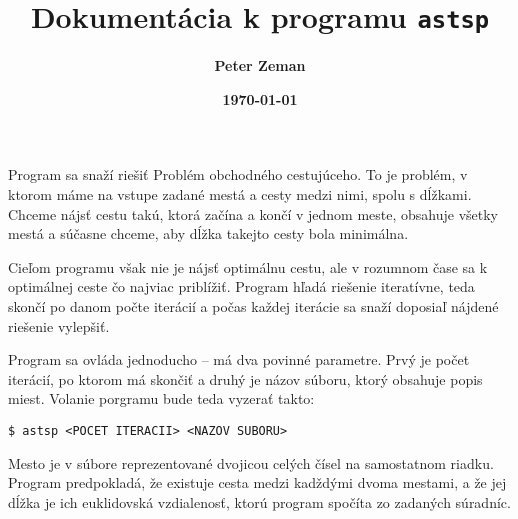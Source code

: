 \documentclass[12pt,a4paper]{article}
\title{\bf Dokumentácia k programu \texttt{astsp}}
\date{\bf\today}
\author{\bf Peter Zeman}
\begin{document}
\maketitle

Program sa snaží riešiť Problém obchodného cestujúceho. To je problém, v ktorom máme na vstupe zadané mestá a cesty
medzi nimi, spolu s dĺžkami. Chceme nájsť cestu takú, ktorá začína a končí v jednom meste, obsahuje všetky mestá a
súčasne chceme, aby dĺžka takejto cesty bola minimálna.

Cieľom programu však nie je nájsť optimálnu cestu, ale v rozumnom čase sa k optimálnej ceste čo najviac priblížiť.
Program hľadá riešenie iteratívne, teda skončí po danom počte iterácií a počas každej iterácie sa snaží doposiaľ nájdené
riešenie vylepšiť.

Program sa ovláda jednoducho -- má dva povinné parametre. Prvý je počet iterácií, po ktorom má skončiť a druhý je názov
súboru, ktorý obsahuje popis miest. Volanie porgramu bude teda vyzerať takto:
\begin{verbatim}$ astsp <POCET ITERACII> <NAZOV SUBORU>\end{verbatim}
Mesto je v súbore reprezentované dvojicou celých čísel na samostatnom riadku. Program predpokladá, že existuje cesta
medzi kadždými dvoma mestami, a že jej dĺžka je ich euklidovská vzdialenosť, ktorú program spočíta zo zadaných
súradníc.
\end{document}

